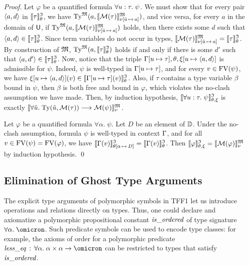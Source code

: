 \begin{proof}
Let $\varphi$ be a quantified formula $\forall u \mathrel{:} \tau .\; \psi$.
We must show that for every pair $\langle a,d \rangle$ in $\llbracket\tau\rrbracket^{\mathfrak{I}}_{\theta}$, we have
$\mathrm{Ty}^{\mathfrak{M}}(a, \llbracket \mathcal{M}(\tau) \rrbracket^{\mathfrak{M}}_{\nu[\hat{u}\,\mapsto\,a]})$,
and vice versa, for every $a$ in the domain of $\mathsf{U}$, if
$\mathrm{Ty}^{\mathfrak{M}}(a, \llbracket \mathcal{M}(\tau) \rrbracket^{\mathfrak{M}}_{\nu[\hat{u}\,\mapsto\,a]})$
holds, then there exists some $d$ such that $\langle a,d \rangle \in
\llbracket\tau\rrbracket^{\mathfrak{I}}_{\theta}$.
%
Since term variables do not occur in types,
$\llbracket \mathcal{M}(\tau) \rrbracket^{\mathfrak{M}}_{\nu[\hat{u}\,\mapsto\,a]} =
\llbracket \tau \rrbracket^{\mathfrak{I}}_\theta$.
By construction of $\mathfrak{M}$,
$\mathrm{Ty}^{\mathfrak{M}}(a, \llbracket \tau \rrbracket^{\mathfrak{I}}_\theta)$
holds if and only if there is some $d'$ such that
$\langle a,d' \rangle \in \llbracket \tau \rrbracket^{\mathfrak{I}}_\theta$.
%
Now, notice that the triple $\mathrm{\Gamma}[u \mapsto \tau],
\theta,\xi[u \mapsto \langle a,d \rangle]$ is admissible for $\psi$.
Indeed, $\psi$ is well-typed in $\mathrm{\Gamma}[u \mapsto \tau]$,
and for every $v \in \mathrm{FV}(\psi)$, we have
$\xi[u \mapsto \langle a,d \rangle](v) \in \llbracket\mathrm{\Gamma}[u \mapsto \tau](v)\rrbracket^{\mathfrak{I}}_{\theta}$.
Also, if $\tau$ contains a type variable $\beta$ bound in $\psi$,
then $\beta$ is both free and bound in $\varphi$, which violates
the no-clash assumption we have made.
%
Then, by induction hypothesis, $\llbracket\forall u \mathrel{:} \tau .\; \psi\rrbracket^{\mathfrak{I}}_{\theta,\xi}$
is exactly $\llbracket \forall \hat{u} .\; \mathrm{Ty}(\hat{u},\mathcal{M}(\tau))
\longrightarrow \mathcal{M}(\psi) \rrbracket^{\mathfrak{M}}_{\nu}$.

Let $\varphi$ be a quantified formula $\forall \alpha .\; \psi$.
Let $D$ be an element of $\mathbb{D}$. Under the no-clash assumption,
formula $\psi$ is well-typed in context $\mathrm{\Gamma}$, and for all
$v \in \mathrm{FV}(\psi) = \mathrm{FV}(\varphi)$, we have
$\llbracket\mathrm{\Gamma}(v)\rrbracket^{\mathfrak{I}}_{\theta[\alpha\,\mapsto\,D]} = \llbracket\mathrm{\Gamma}(v)\rrbracket^{\mathfrak{I}}_{\theta}$.
Then $\llbracket\varphi\rrbracket^{\mathfrak{I}}_{\theta,\xi} = \llbracket \mathcal{M}(\varphi) \rrbracket^{\mathfrak{M}}_{\nu}$ by induction hypothesis.
\qed
\end{proof}

\subsection{Elimination of Ghost Type Arguments} \label{ssec:ghost}
The explicit type arguments of polymorphic symbols
in TFF1 let us introduce operations and relations directly on types.
Thus, one could declare and axiomatize a polymorphic propositional
constant $\mathit{is\_ordered}$ of type signature $\forall\alpha.\;\omicron$.
Such predicate symbols can be used to encode type classes:
for example, the axioms of order for a polymorphic predicate
$\sym{less\_eq} \,\ty\, \forall\alpha.\;\alpha\times\alpha\to\omicron$
can be restricted to types that satisfy $\mathit{is\_ordered}$.


